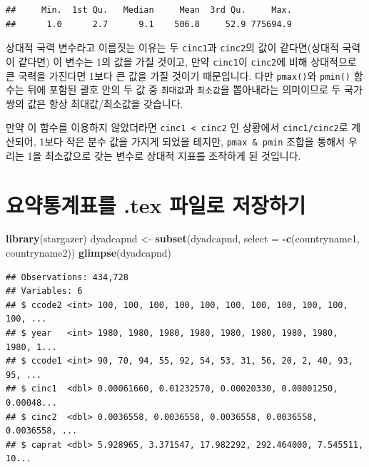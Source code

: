 \documentclass[]{book}
\newenvironment{Shaded}{\begin{snugshade}}{\end{snugshade}}
\newcommand{\DataTypeTok}[1]{\textcolor[rgb]{0.13,0.29,0.53}{#1}}
\newcommand{\KeywordTok}[1]{\textcolor[rgb]{0.13,0.29,0.53}{\textbf{#1}}}
\newcommand{\NormalTok}[1]{#1}
\newcommand{\OperatorTok}[1]{\textcolor[rgb]{0.81,0.36,0.00}{\textbf{#1}}}
\newcommand{\StringTok}[1]{\textcolor[rgb]{0.31,0.60,0.02}{#1}}
\begin{document}
\begin{verbatim}
##     Min.  1st Qu.   Median     Mean  3rd Qu.     Max. 
##      1.0      2.7      9.1    506.8     52.9 775694.9
\end{verbatim}

상대적 국력 변수라고 이름짓는 이유는 두 \texttt{cinc1}과 \texttt{cinc2}의 값이 같다면(상대적 국력이 같다면) 이 변수는 1의 값을 가질 것이고, 만약 \texttt{cinc1}이 \texttt{cinc2}에 비해 상대적으로 큰 국력을 가진다면 1보다 큰 값을 가질 것이기 때문입니다. 다만 \texttt{pmax()}와 \texttt{pmin()} 함수는 뒤에 포함된 괄호 안의 두 값 중 \texttt{최대값}과 \texttt{최소값}을 뽑아내라는 의미이므로 두 국가쌍의 값은 항상 최대값/최소값을 갖습니다.

만약 이 함수를 이용하지 않았더라면 \texttt{cinc1\ \textless{}\ cinc2} 인 상황에서 \texttt{cinc1/cinc2}로 계산되어, 1보다 작은 분수 값을 가지게 되었을 테지만, \texttt{pmax\ \&\ pmin} 조합을 통해서 우리는 1을 최소값으로 갖는 변수로 상대적 지표를 조작하게 된 것입니다.

\hypertarget{uxc694uxc57duxd1b5uxacc4uxd45cuxb97c-.tex-uxd30cuxc77cuxb85c-uxc800uxc7a5uxd558uxae30}{%
\section{요약통계표를 .tex 파일로 저장하기}\label{uxc694uxc57duxd1b5uxacc4uxd45cuxb97c-.tex-uxd30cuxc77cuxb85c-uxc800uxc7a5uxd558uxae30}}

\begin{Shaded}
\begin{Highlighting}[]
\KeywordTok{library}\NormalTok{(stargazer)}
\NormalTok{dyadcapnd <-}\StringTok{ }\KeywordTok{subset}\NormalTok{(dyadcapnd, }
                    \DataTypeTok{select =} \OperatorTok{-}\KeywordTok{c}\NormalTok{(countryname1, countryname2))}
\KeywordTok{glimpse}\NormalTok{(dyadcapnd)}
\end{Highlighting}
\end{Shaded}

\begin{verbatim}
## Observations: 434,728
## Variables: 6
## $ ccode2 <int> 100, 100, 100, 100, 100, 100, 100, 100, 100, 100, 100, ...
## $ year   <int> 1980, 1980, 1980, 1980, 1980, 1980, 1980, 1980, 1980, 1...
## $ ccode1 <int> 90, 70, 94, 55, 92, 54, 53, 31, 56, 20, 2, 40, 93, 95, ...
## $ cinc1  <dbl> 0.00061660, 0.01232570, 0.00020330, 0.00001250, 0.00048...
## $ cinc2  <dbl> 0.0036558, 0.0036558, 0.0036558, 0.0036558, 0.0036558, ...
## $ caprat <dbl> 5.928965, 3.371547, 17.982292, 292.464000, 7.545511, 10...
\end{verbatim}
\end{document}
